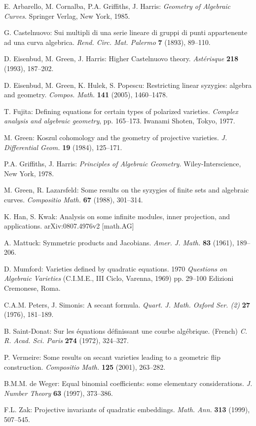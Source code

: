\documentclass{amsart}
\theoremstyle{definition}
\begin{document}
\begin{thebibliography}{A-C-G-H}
E. Arbarello, M. Cornalba, P.A. Griffiths, J. Harris: \emph{Geometry
of Algebraic Curves}. Springer Verlag, New York, 1985.

G. Castelnuovo: Sui multipli di una serie lineare di gruppi di punti
appartenente ad una curva algebrica. \emph{Rend. Circ. Mat. Palermo}
\textbf{7} (1893), 89--110.

D. Eisenbud, M. Green, J. Harris: Higher Castelnuovo theory.
\emph{Ast\'erisque} \textbf{218} (1993), 187--202.

D. Eisenbud, M. Green, K. Hulek, S. Popescu: Restricting linear
syzygies: algebra and geometry. \emph{Compos. Math.} \textbf{141}
(2005), 1460--1478.

T. Fujita: Defining equations for certain types of polarized
varieties. \emph{Complex analysis and algebraic geometry}, pp.
165--173. Iwanami Shoten, Tokyo, 1977.

M. Green: Koszul cohomology and the geometry of projective
varieties. \emph{J. Differential Geom.} \textbf{19} (1984),
125--171.

P.A. Griffiths, J. Harris: \emph{Principles of Algebraic Geometry.}
Wiley-Interscience, New York, 1978.

M. Green, R. Lazarsfeld: Some results on the syzygies of finite sets
and algebraic curves. \emph{Compositio Math.} \textbf{67} (1988),
301--314.

K. Han, S. Kwak: Analysis on some infinite modules, inner
projection, and applications. arXiv:0807.4976v2 [math.AG]

A. Mattuck: Symmetric products and Jacobians. \emph{Amer. J. Math.}
\textbf{83} (1961), 189--206.

D. Mumford: Varieties defined by quadratic equations. 1970
\emph{Questions on Algebraic Varieties} (C.I.M.E., III Ciclo,
Varenna, 1969) pp. 29--100 Edizioni Cremonese, Roma.

C.A.M. Peters, J. Simonis: A secant formula. \emph{Quart. J. Math.
Oxford Ser. (2)} \textbf{27} (1976), 181--189.

B. Saint-Donat: Sur les \'equations d\'efinissant une courbe
alg\'ebrique. (French) \emph{C. R. Acad. Sci. Paris} \textbf{274}
(1972), 324--327.

P. Vermeire: Some results on secant varieties leading to a geometric
flip construction. \emph{Compositio Math.} \textbf{125} (2001),
263--282.

B.M.M. de Weger: Equal binomial coefficients: some elementary
considerations. \emph{J. Number Theory} \textbf{63} (1997),
373--386.

F.L. Zak: Projective invariants of quadratic embeddings. \emph{Math.
Ann.} \textbf{313} (1999), 507--545.
\end{thebibliography}
\end{document}

